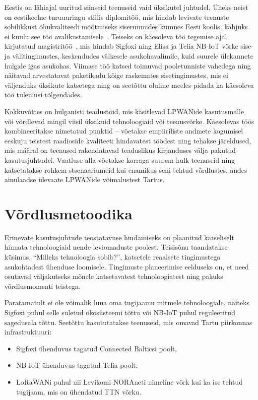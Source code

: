 \documentclass[12pt]{article}
\begin{document}
    Eestis on lähiajal uuritud siinseid teenuseid vaid üksikutel juhtudel.
    Üheks neist on eestikeelne turuuuringu stiilis diplomitöö, mis hindab levivate teenuste sobilikkust õhukvaliteedi mõõtmiseks siseruumides kümnes Eesti koolis, kahjuks ei kuulu see töö avalikustamisele~\cite{sild2019}.
    Teiseks on käesoleva töö tegemise ajal kirjutatud magistritöö~, mis hindab Sigfoxi ning Elisa ja Telia NB-IoT võrke sise- ja välitingimustes, keskendudes väikesele asukohavalimile, kuid suurele ülekannete hulgale igas asukohas.
    Viimase töö katsed toimuvad pooletunniste vahedega ning näitavad arvestatavat paketikadu kõige raskemates sisetingimustes, mis ei väljenduks üksikute katsetega ning on seetõttu oluline meeles pidada ka käesoleva töö tulemusi tõlgendades.

    Kokkuvõttes on hulganisti teadustöid, mis käsitlevad LPWANide kasutusmalle või võrdlevad mingil viisil üksikuid tehnoloogiaid või teenusvõrke.
    Käesolevas töös kombineeritakse nimetatud punktid -- võetakse empiiriliste andmete kogumisel eeskuju teistest raadioside kvaliteeti hindavatest töödest ning tehakse järeldused, mis määral on teenused rakendatavad teaduslikus kirjanduses välja pakutud kasutusjuhtudel.
    Vaatluse alla võetakse korraga suurem hulk teenuseid ning katsetatakse rohkem stsenaariumeid kui enamikus seni tehtud võrdlustes, andes ainulaadse ülevaate LPWANide võimalustest Tartus.

    \newpage

    \section{Võrdlusmetoodika}

    Erinevate kasutusjuhtude teostatavuse hindamiseks on plaanitud katseliselt hinnata tehnoloogiaid nende leviomaduste poolest.
    Teisisõnu taandatakse küsimus, "`Milleks tehnoloogia sobib?"', katsetele reaalsete tingimustega asukohtadest ühenduse loomisele.
    Tingimuste planeerimise eelduseks on, et need osutavad väljakutseks mõnele katsetavatest tehnoloogiatest ning pakuks võrdlusmomenti teistega.

    Paratamatult ei ole võimalik luua oma tugijaamu mitmele tehnoloogiale, näiteks Sigfoxi puhul selle suletud ökosüsteemi tõttu või NB-IoT puhul reguleeritud sagedusala tõttu.
    Seetõttu kasututatakse teenuseid, mis omavad Tartu piirkonnas infrastruktuuri:
    \begin{itemize}
        \item Sigfoxi ühenduvus tagatud Connected Balticsi poolt,
        \item NB-IoT ühenduvus tagatud Telia poolt,
        \item LoRaWANi puhul nii Levikomi NORAneti nimeline võrk kui ka ise tehtud tugijaam, mis on ühendatud TTN võrku.
    \end{itemize}
\end{document}
